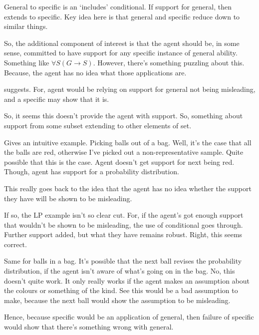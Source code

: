 \begin{note}[`includes']
  General to specific is an `includes' conditional.
  If support for general, then extends to specific.
  Key idea here is that general and specific reduce down to similar things.

  So, the additional component of interest is that the agent should be, in some sense, committed to have support for any specific instance of general ability.
  Something like \(\forall S(G \rightarrow S)\).
  However, there's something puzzling about this.
  Because, the agent has no idea what those applications are.

  \nI{} suggests.
  For, agent would be relying on support for general not being misleading, and a specific may show that it is.


  
  So, it seems this doesn't provide the agent with support.
  So, something about support from some subset extending to other elements of set.

  Gives an intuitive example.
  Picking balls out of a bag.
  Well, it's the case that all the balls are red, otherwise I've picked out a non-representative sample.
  Quite possible that this is the case.
  Agent doesn't get support for next being red.
  Though, agent has support for a probability distribution.

  This really goes back to the idea that the agent has no idea whether the support they have will be shown to be misleading.

  If so, the LP example isn't so clear cut.
  For, if the agent's got enough support that wouldn't be shown to be misleading, the use of conditional goes through.
  Further support added, but what they have remains robust.
  Right, this seems correct.

  Same for balls in a bag.
  It's possible that the next ball revises the probability distribution, if the agent isn't aware of what's going on in the bag.
  No, this doesn't quite work.
  It only really works if the agent makes an assumption about the colours or something of the kind.
  See this would be a bad assumption to make, because the next ball would show the assumption to be misleading.

  Hence, because specific would be an application of general, then failure of specific would show that there's something wrong with general.
\end{note}

